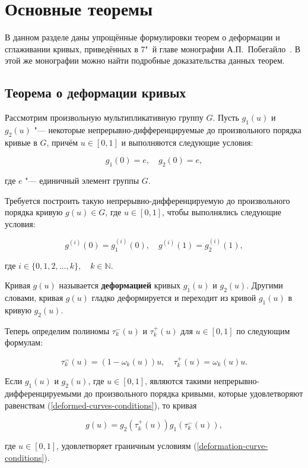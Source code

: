 \section{Основные теоремы}

В данном разделе даны упрощённые формулировки теорем о деформации и сглаживании кривых, приведённых в 7"~й главе
монографии А.П.~Побегайло~\cite{pobegaylo}. В этой же монографии можно найти подробные доказательства данных теорем.

\subsection*{Теорема о деформации кривых}

Рассмотрим произвольную мультипликативную группу $G$. Пусть $g_1(u)$ и $g_2(u)$ "--- некоторые
непрерывно-дифференцируемые до произвольного порядка кривые в $G$, причём $u \in [0,1]$ и выполняются следующие условия:

\begin{equation}
g_1(0)=e, \quad g_2(0)=e,
\label{deformed-curves-conditions}
\end{equation}

\noindent где $e$ "--- единичный элемент группы $G$.

Требуется построить такую непрерывно-дифференцируемую до произвольного порядка кривую $g(u)\in G$, где $u \in [0,1]$,
чтобы выполнялись следующие условия:

\begin{equation}
g^{(i)}(0)=g_1^{(i)}(0), \quad g^{(i)}(1)=g_2^{(i)}(1),
\label{deformation-curve-conditions}
\end{equation}

\noindent где $i \in \{0,1,2,\dots,k\},\quad k\in\mathbb{N}$.

\begin{definition}
Кривая $g(u)$ называется \textbf{деформацией} кривых $g_1(u)$ и $g_2(u)$. Другими словами, кривая $g(u)$ гладко
деформируется и переходит из кривой $g_1(u)$ в кривую $g_2(u)$.
\end{definition}

Теперь определим полиномы $\tau_k^-(u)$ и $\tau_k^+(u)$ для $u \in [0,1]$ по следующим формулам:

$$
\tau_k^-(u)=(1-\omega_k(u))u, \quad \tau_k^+(u)=\omega_k(u)u.
$$

\begin{theorem}
Если $g_1(u)$ и $g_2(u)$, где $u \in [0,1]$, являются такими непрерывно-дифференцируемыми до произвольного порядка
кривыми, которые удовлетворяют равенствам (\ref{deformed-curves-conditions}), то кривая

$$
g(u)=g_2(\tau_k^+(u))g_1(\tau_k^-(u)),
$$

\noindent где $u \in [0,1]$, удовлетворяет граничным условиям (\ref{deformation-curve-conditions}).
\end{theorem}

